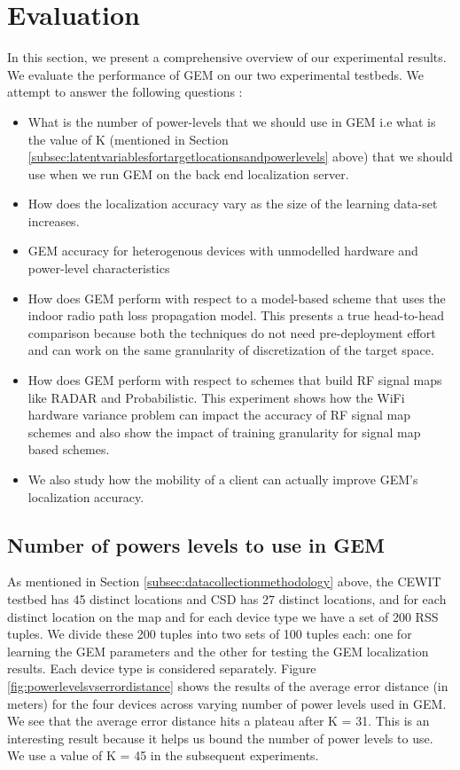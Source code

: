 \section{Evaluation}
\label{sec:evaluation}

In this section, we present a comprehensive overview of our experimental results. We evaluate the performance of GEM on our two experimental testbeds. We attempt to answer the following questions :

\begin{itemize}

\item What is the number of power-levels that we should use in GEM i.e what is the value of K (mentioned in Section \ref{subsec:latentvariablesfortargetlocationsandpowerlevels} above) that we should use when we run GEM on the back end localization server. 
\item How does the localization accuracy vary as the size of the learning data-set increases.
\item GEM accuracy for heterogenous devices with unmodelled hardware and power-level characteristics
\item How does GEM perform with respect to a model-based scheme that uses the indoor radio path loss propagation model. This presents a true head-to-head comparison because both the techniques do not need pre-deployment effort and can work on the same granularity of discretization of the target space.
\item How does GEM perform with respect to schemes that build RF signal maps like RADAR and Probabilistic. This experiment shows how the WiFi hardware variance problem can impact the accuracy of RF signal map schemes and also show the impact of training granularity for signal map based schemes.
\item We also study how the mobility of a client can actually improve GEM's localization accuracy. 

\end{itemize}

\subsection{Number of powers levels to use in GEM}
\label{subsec:numberofpowerlevelstouseingem}

As mentioned in Section \ref{subsec:datacollectionmethodology} above, the CEWIT testbed has 45 distinct locations and CSD has 27 distinct locations, and for each distinct location on the map and for each device type we have a set of 200 RSS tuples. We divide these 200 tuples into two sets of 100 tuples each: one for learning the GEM parameters and the other for testing the GEM localization results. Each device type is considered separately. Figure \ref{fig:powerlevelsvserrordistance} shows the results of the average error distance (in meters) for the four devices across varying number of power levels used in GEM. We see that the average error distance hits a plateau after K = 31. This is an interesting result because it helps us bound the number of power levels to use. We use a value of K = 45 in the subsequent experiments. 

